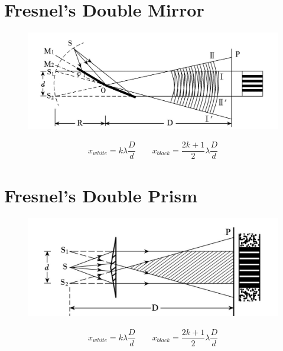 \section{Fresnel's Double Mirror}

\begin{figure}[H]
  \centering
  \includegraphics[width=0.9\linewidth]{figures/Fresnel-Double-Mirror}
\end{figure}

\begin{equation*}
  \begin{aligned}
    x_{white} = k \lambda \dfrac{D}{d} \quad\quad x_{black} = \dfrac{2 k + 1}{2} \lambda \dfrac{D}{d}   
  \end{aligned}
\end{equation*}

\section{Fresnel's Double Prism}

\begin{figure}[H]
  \centering
  \includegraphics[width=0.9\linewidth]{figures/Fresnel-double-prism}
\end{figure}

\begin{equation*}
  \begin{aligned}
    x_{white} = k \lambda \dfrac{D}{d} \quad\quad x_{black} = \dfrac{2 k + 1}{2} \lambda \dfrac{D}{d}   
  \end{aligned}
\end{equation*}


